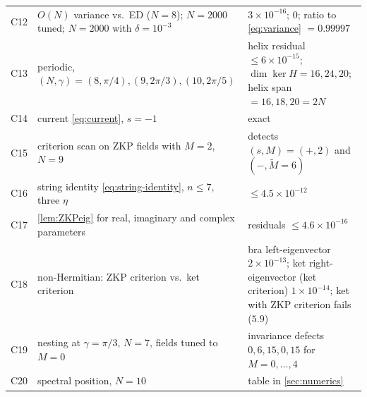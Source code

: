 \documentclass[11pt,a4paper]{article}
\theoremstyle{definition}
\begin{document}
\begin{center}
\begin{longtable}{p{0.9cm}p{6.6cm}p{6.6cm}}
C12 & $O(N)$ variance vs.\ ED ($N=8$); $N=2000$ tuned; $N=2000$ with $\delta=10^{-3}$ & $3\times10^{-16}$; $0$; ratio to \eqref{eq:variance} $=0.99997$\\
C13 & periodic, $(N,\gamma)=(8,\pi/4),(9,2\pi/3),(10,2\pi/5)$ & helix residual $\le6\times10^{-15}$; $\dim\ker H=16,24,20$; helix span $=16,18,20=2N$\\
C14 & current \eqref{eq:current}, $s=-1$ & exact\\
C15 & criterion scan on ZKP fields with $M=2$, $N=9$ & detects $(s,M)=(+,2)$ and $(-,\widetilde M=6)$\\
C16 & string identity \eqref{eq:string-identity}, $n\le7$, three $\eta$ & $\le4.5\times10^{-12}$\\
C17 & \cref{lem:ZKPeig} for real, imaginary and complex parameters & residuals $\le4.6\times10^{-16}$\\
C18 & non-Hermitian: ZKP criterion vs.\ ket criterion & bra left-eigenvector $2\times10^{-13}$; ket right-eigenvector (ket criterion) $1\times10^{-14}$; ket with ZKP criterion fails ($5.9$)\\
C19 & nesting at $\gamma=\pi/3$, $N=7$, fields tuned to $M=0$ & invariance defects $0,6,15,0,15$ for $M=0,\dots,4$\\
C20 & spectral position, $N=10$ & table in \cref{sec:numerics}\\ \bottomrule
\end{longtable}
\end{center}
\end{document}
